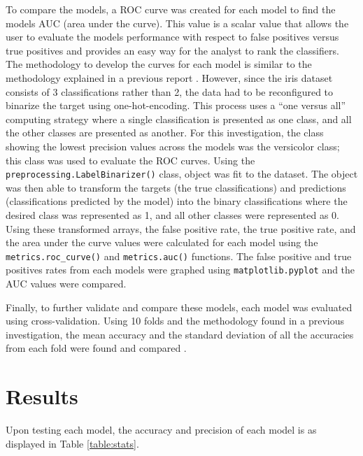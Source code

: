 \documentclass[journal]{IEEEtran}
\begin{document}
To compare the models, a ROC curve was created for each model to find the models AUC (area under the curve). This value is a scalar value that allows the user to evaluate the models performance with respect to false positives versus true positives and provides an easy way for the analyst to rank the classifiers. The methodology to develop the curves for each model is similar to the methodology explained in a previous report \cite{b6}.  However, since the iris dataset consists of 3 classifications rather than 2, the data had to be reconfigured to binarize the target using one-hot-encoding. This process uses a “one versus all” computing strategy where a single classification is presented as one class, and all the other classes are presented as another. For this investigation, the class showing the lowest precision values across the models was the versicolor class; this class was used to evaluate the ROC curves. Using the \lstinline{preprocessing.LabelBinarizer()} class, object was fit to the dataset. The object was then able to transform the targets (the true classifications) and predictions (classifications predicted by the model) into the binary classifications where the desired class was represented as 1, and all other classes were represented as 0. Using these transformed arrays, the false positive rate, the true positive rate, and the area under the curve values were calculated for each model using the \lstinline{metrics.roc_curve()} and \lstinline{metrics.auc()} functions. The false positive and true positives rates from each models were graphed using \lstinline{matplotlib.pyplot} and the AUC values were compared. 

Finally, to further validate and compare these models, each model was evaluated using cross-validation. Using 10 folds and the methodology found in a previous investigation, the mean accuracy and the standard deviation of all the accuracies from each fold were found and compared \cite{b7}.

\section{Results}
\label{sec:results}

Upon testing each model, the accuracy and precision of each model is as displayed in Table \ref{table:stats}. 
\end{document}
